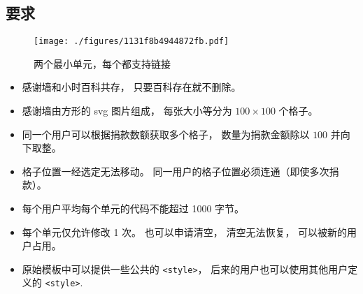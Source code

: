 
\subsection{要求}

\begin{figure}[ht]
\centering
\texttt{[image: ./figures/1131f8b4944872fb.pdf]}
\caption{两个最小单元，每个都支持链接} \label{fig_thanks_1}
\end{figure}

\begin{itemize}
\item 感谢墙和小时百科共存， 只要百科存在就不删除。
\item 感谢墙由方形的 svg 图片组成， 每张大小等分为 $100\times 100$ 个格子。
\item 同一个用户可以根据捐款数额获取多个格子， 数量为捐款金额除以 $100$ 并向下取整。
\item 格子位置一经选定无法移动。 同一用户的格子位置必须连通（即使多次捐款）。
\item 每个用户平均每个单元的代码不能超过 1000 字节。
\item 每个单元仅允许修改 1 次。 也可以申请清空， 清空无法恢复， 可以被新的用户占用。
\item 原始模板中可以提供一些公共的 \verb`<style>`， 后来的用户也可以使用其他用户定义的 \verb`<style>`.
\end{itemize}

